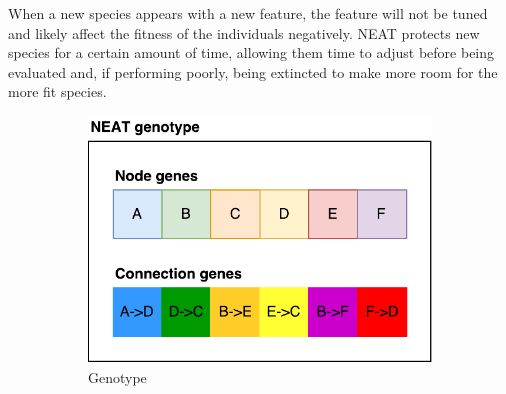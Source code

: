 When a new species appears with a new feature,
the feature will not be tuned and likely affect the fitness of the individuals negatively.
NEAT protects new species for a certain amount of time,
allowing them time to adjust before being evaluated and, if performing poorly, being extincted to make more room for the more fit species.

\begin{figure}
\centering
\begin{subfigure}[t]{.63\columnwidth}
\centering
\includegraphics[width=\columnwidth]{fig/NEAT_gt}
\caption{Genotype}
\end{subfigure}\hfill%
\begin{subfigure}[t]{.33\columnwidth}
\centering

\end{subfigure}
\end{figure}
